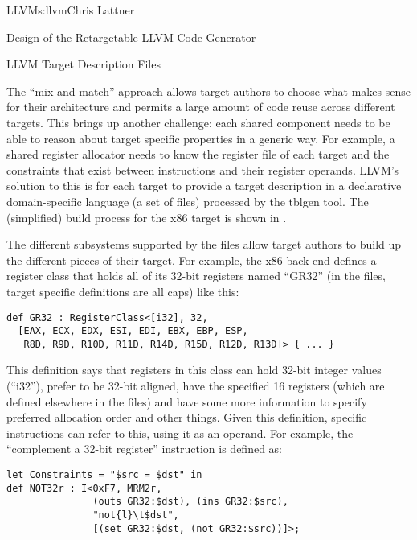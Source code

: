 \begin{aosachapter}{LLVM}{s:llvm}{Chris Lattner}
\begin{aosasect1}{Design of the Retargetable LLVM Code Generator}
\begin{aosasect2}{LLVM Target Description Files}

The ``mix and match'' approach allows target authors to choose what
makes sense for their architecture and permits a large amount of code
reuse across different targets.  This brings up another challenge:
each shared component needs to be able to reason about target specific
properties in a generic way. For example, a shared register allocator
needs to know the register file of each target and the constraints
that exist between instructions and their register operands.  LLVM's
solution to this is for each target to provide a target description in
a declarative domain-specific language (a set of  files)
processed by the tblgen tool.  The (simplified) build process for the
x86 target is shown in .


The different subsystems supported by the  files allow
target authors to build up the different pieces of their target. For
example, the x86 back end defines a register class that holds all of
its 32-bit registers named ``GR32'' (in the  files, target
specific definitions are all caps) like this:

\begin{verbatim}
def GR32 : RegisterClass<[i32], 32,
  [EAX, ECX, EDX, ESI, EDI, EBX, EBP, ESP,
   R8D, R9D, R10D, R11D, R14D, R15D, R12D, R13D]> { ... }
\end{verbatim}

\noindent This definition says that registers in this class can hold 32-bit
integer values (``i32''), prefer to be 32-bit aligned, have the
specified 16 registers (which are defined elsewhere in the 
files) and have some more information to specify preferred allocation
order and other things.  Given this definition, specific instructions
can refer to this, using it as an operand.  For example, the
``complement a 32-bit register'' instruction is defined as:

\begin{verbatim}
let Constraints = "$src = $dst" in
def NOT32r : I<0xF7, MRM2r,
               (outs GR32:$dst), (ins GR32:$src),
               "not{l}\t$dst",
               [(set GR32:$dst, (not GR32:$src))]>;
\end{verbatim}


\end{aosasect2}
\end{aosasect1}
\end{aosachapter}
